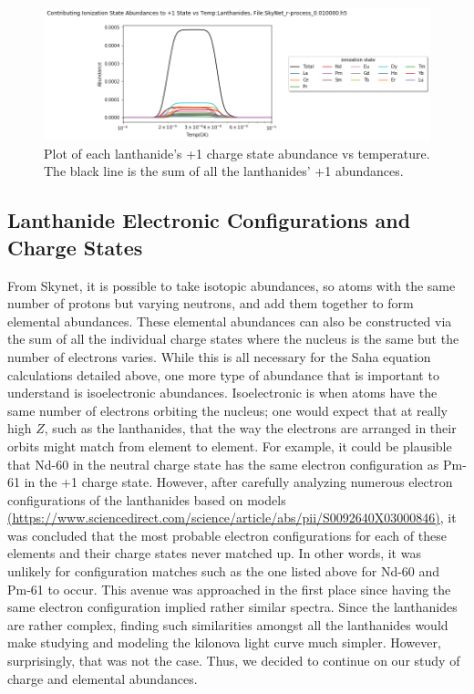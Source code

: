 \documentclass[11pt,a4paper]{article}
\begin{document}
\begin{figure}[h!]
  \includegraphics[scale = .6]{plus_one.png}
  \caption{Plot of each lanthanide's +1 charge state abundance vs temperature. The black line is the sum of all the lanthanides' +1 abundances. }
\end{figure} 

\pagebreak
 
\subsection{Lanthanide Electronic Configurations and Charge States}

From Skynet, it is possible to take isotopic abundances, so atoms with the same number of protons but varying neutrons, and add them together to form elemental abundances. These elemental abundances can also be constructed via the sum of all the individual charge states where the nucleus is the same but the number of electrons varies. While this is all necessary for the Saha equation calculations detailed above, one more type of abundance that is important to understand is isoelectronic abundances. Isoelectronic is when atoms have the same number of electrons orbiting the nucleus; one would expect that at really high $Z$, such as the lanthanides, that the way the electrons are arranged in their orbits might match from element to element. For example, it could be plausible that Nd-60 in the neutral charge state has the same electron configuration as Pm-61 in the +1 charge state. However, after carefully analyzing numerous electron configurations of the lanthanides based on models \url{(https://www.sciencedirect.com/science/article/abs/pii/S0092640X03000846)}, it was concluded that the most probable electron configurations for each of these elements and their charge states never matched up. In other words, it was unlikely for configuration matches such as the one listed above for Nd-60 and Pm-61 to occur.
This avenue was approached in the first place since having the same electron configuration implied rather similar spectra. Since the lanthanides are rather complex, finding such similarities amongst all the lanthanides would make studying and modeling the kilonova light curve much simpler. However, surprisingly, that was not the case. Thus, we decided to continue on our study of charge and elemental abundances.
\end{document}
